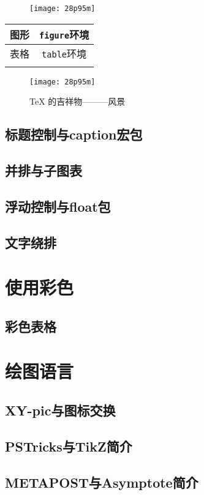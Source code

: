 \documentclass[a4paper, titlepage, hyperref, UTF8]{ctexart}
\begin{document}
\begin{figure}[htbp]
	\centering
	\texttt{[image: 28p95m]}
\end{figure}

\begin{table}
	\centering
	\begin{tabular}{|c|c|}
	\firsthline
	图形 & \verb|figure|环境\\ \hline
	表格 & \verb|table|环境\\
	\lasthline
	\end{tabular}
\end{table}

\begin{figure}
\centering
\texttt{[image: 28p95m]}
\caption[风景]{\TeX{} 的吉祥物———风景}\label{fig-28p95m}
\end{figure}



\subsection{标题控制与caption宏包}
\subsection{并排与子图表}
\subsection{浮动控制与float包}
\subsection{文字绕排}

\section{使用彩色}
\subsection{彩色表格}

\section{绘图语言}
\subsection{XY-pic与图标交换}
\subsection{PSTricks与TikZ简介}
\subsection{METAPOST与Asymptote简介}
\end{document}
